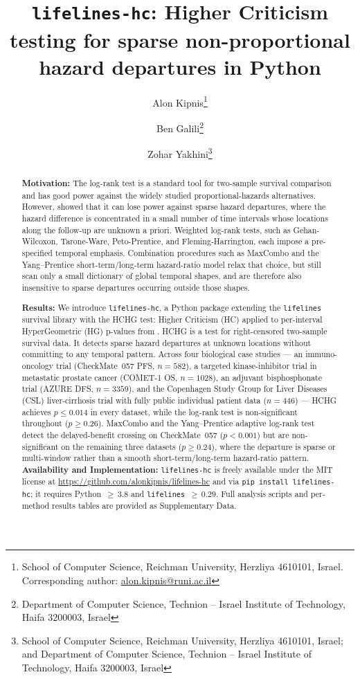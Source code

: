 \documentclass[11pt]{article}
\title{\texttt{lifelines-hc}: Higher Criticism testing for sparse
  non-proportional hazard departures in Python}
\author{%
  Alon Kipnis\thanks{School of Computer Science, Reichman University,
    Herzliya 4610101, Israel. Corresponding author:
    \href{mailto:alon.kipnis@runi.ac.il}{alon.kipnis@runi.ac.il}}
  \and
  Ben Galili\thanks{Department of Computer Science, Technion -- Israel
    Institute of Technology, Haifa 3200003, Israel}
  \and
  Zohar Yakhini\thanks{School of Computer Science, Reichman University,
    Herzliya 4610101, Israel; and Department of Computer Science,
    Technion -- Israel Institute of Technology, Haifa 3200003, Israel}%
}
\date{}
\begin{document}
\maketitle

\begin{abstract}
\textbf{Motivation:}
The log-rank test is a standard tool for two-sample survival comparison and has good power against the widely studied proportional-hazards alternatives. However, \citet{kipnis_biometrika} showed that it can lose power against sparse hazard departures, where the hazard difference is concentrated in a small number of time intervals whose locations along the follow-up are unknown a priori. Weighted log-rank tests, such as Gehan-Wilcoxon, Tarone-Ware, Peto-Prentice, and Fleming-Harrington, each impose a pre-specified temporal emphasis. Combination procedures such as MaxCombo \citep{lin2020maxcombo} and the Yang--Prentice short-term/long-term hazard-ratio model \citep{yang2005,yang2010improved} relax that choice, but still scan only a small dictionary of global temporal shapes, and are therefore also insensitive to sparse departures occurring outside those shapes.

\textbf{Results:}
We introduce \texttt{lifelines-hc}, a Python package extending the
\texttt{lifelines} survival library with the HCHG test: Higher Criticism
(HC) applied to per-interval HyperGeometric (HG) p-values from
\citet{kipnis_biometrika}. 
HCHG is a test for right-censored two-sample survival data. It detects sparse hazard departures at unknown locations without committing to any temporal pattern. Across four biological case studies
— an immuno-oncology trial (CheckMate~057 PFS, $n=582$), a targeted
kinase-inhibitor trial in metastatic prostate cancer (COMET-1 OS,
$n=1028$), an adjuvant bisphosphonate trial (AZURE DFS, $n=3359$),
and the
Copenhagen Study Group for Liver Diseases (CSL) liver-cirrhosis trial with fully public individual patient data ($n=446$) — HCHG achieves $p \leq 0.014$ in every dataset, while the log-rank test is non-significant throughout ($p \geq 0.26$). MaxCombo and the Yang--Prentice adaptive log-rank test detect the delayed-benefit crossing on CheckMate~057 ($p < 0.001$) but are non-significant on the remaining three datasets ($p \geq 0.24$), where the departure is sparse or multi-window rather than a smooth short-term/long-term hazard-ratio pattern.\\

\textbf{Availability and Implementation:}
\texttt{lifelines-hc} is freely available under the MIT license at
\url{https://github.com/alonkipnis/lifelines-hc} and via
\texttt{pip install lifelines-hc}; it requires Python~${\geq}\,3.8$ and
\texttt{lifelines}~${\geq}\,0.29$. Full analysis scripts and per-method
results tables are provided as Supplementary Data.%
\end{abstract}
\end{document}
